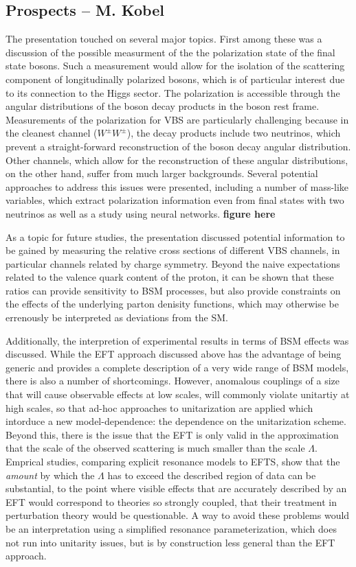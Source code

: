 \subsection{Prospects -- M. Kobel}

The presentation touched on several major topics. First among these was a discussion of the possible measurment of the the polarization state of the final state bosons.
Such a measurement would allow for the isolation of the scattering component of longitudinally polarized bosons, which is of particular interest due to its connection to the Higgs sector.
The polarization is accessible through the angular distributions of the boson decay products in the boson rest frame. 
Measurements of the polarization for VBS are particularly challenging because in the cleanest channel ($W^\pm W^\pm$), the decay products include two neutrinos, which prevent a straight-forward reconstruction of the boson decay angular distribution. Other channels, which allow for the reconstruction of these angular distributions, on the other hand, suffer from much larger backgrounds. Several potential approaches to address this issues were presented, including a number of mass-like variables, which extract polarization information even from final states with two neutrinos as well as a study using neural networks. \textbf{figure here}

As a topic for future studies, the presentation discussed potential information to be gained by measuring the relative cross sections of different VBS channels, in particular channels related by charge symmetry. Beyond the naive expectations related to the valence quark content of the proton, it can be shown that these ratios can provide sensitivity to BSM processes, but also provide constraints on the effects of the underlying parton denisity functions, which may otherwise be errenously be interpreted as deviations from the SM.

Additionally, the interpretion of experimental results in terms of BSM effects was discussed. While the EFT approach discussed above has the advantage of being generic and provides a complete description of a very wide range of BSM models, there is also a number of shortcomings. However, anomalous couplings of a size that will cause observable effects at low scales, will  commonly violate unitartiy at high scales, so that ad-hoc approaches to unitarization are applied which intorduce a new model-dependence: the dependence on the unitarization scheme.
Beyond this, there is the issue that the EFT is only valid in the approximation that the scale of the observed scattering is much smaller than the scale $\Lambda$. Emprical studies, comparing explicit resonance models to EFTS, show that the \textit{amount} by which the $\Lambda$ has to exceed the described region of data can be substantial, to the point where visible effects that are accurately described by an EFT would correspond to theories so strongly coupled, that their treatment in perturbation theory would be questionable. A way to avoid these problems would be an interpretation using a simplified resonance parameterization, which does not run into unitarity issues, but is by construction less general than the EFT approach.




